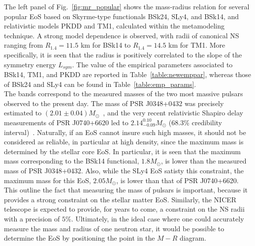 The left panel of Fig.~\ref{fig:mr_popular} shows the mass-radius relation for 
several popular EoS based on Skyrme-type functionals BSk24, SLy4, and BSk14, 
and relativistic models PKDD and TM1, calculated within the metamodeling 
technique. A strong model dependence is observed, with radii of canonical NS 
ranging from $R_{1.4}=11.5$ km for BSk14 to $R_{1.4}=14.5$ km for TM1. More
specifically, it is seen that the radius is positively correlated to the slope 
of the symmetry energy $L_{sym}$. The value of the empirical parameters 
associated to BSk14, TM1, and PKDD are reported in Table~\ref{table:newemppar}, 
whereas those of BSk24 and SLy4 can be found in Table~\ref{table:emp_params}.\\
The bands correspond to the measured masses of the two most massive
pulsars observed to the present day. The mass of PSR J0348+0432 was precisely 
estimated to $(2.01\pm 0.04)M_\odot$~\cite{Antoniadis2013}, and the very recent
relativistic Shapiro delay measurements of PSR J0740+6620 led to 
$2.14_{-0.09}^{0.10}M_\odot$ ($68.3\%$ credibility
interval)~\cite{Cromartie2020}. Naturally, if an
EoS cannot insure such high masses, it should not be considered as reliable, 
in particular at high density, since the maximum mass is determined by the 
stellar core EoS. In particular, it is seen that the maximum mass corresponding
to the BSk14 functional, $1.8M_\odot$, is lower than the measured mass
of PSR J0348+0432. Also, while the SLy4 EoS satisty this constraint, the maximum 
mass for this EoS, $2.05M_\odot$, is lower than that of PSR J0740+6620. This 
outline the fact that measuring the mass of pulsars is important, because it 
provides a strong constraint on the stellar matter EoS. Similarly, the NICER
telescope is expected to provide, for years to come, a constraint on the NS
radii with a precision of $5\%$. Ultimately, in the ideal case where one could 
accurately measure the mass and radius of one neutron star, it would be 
possible to determine the EoS by positioning the point in the $M-R$ diagram.


